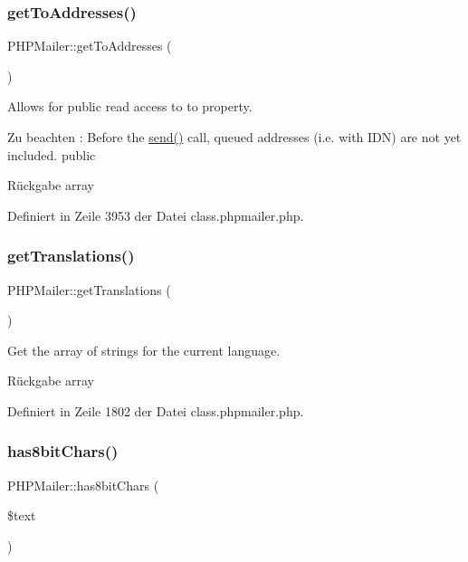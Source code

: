 \subsubsection{\texorpdfstring{get\+To\+Addresses()}{getToAddresses()}}
{\footnotesize\ttfamily P\+H\+P\+Mailer\+::get\+To\+Addresses (\begin{DoxyParamCaption}{ }\end{DoxyParamCaption})}

Allows for public read access to \textquotesingle{}to\textquotesingle{} property. \begin{DoxyNote}{Zu beachten}
\+: Before the \mbox{\hyperlink{class_p_h_p_mailer_afdd4742f07cfb0bfa7be86ce20468fa3}{send()}} call, queued addresses (i.\+e. with I\+DN) are not yet included.  public 
\end{DoxyNote}
\begin{DoxyReturn}{Rückgabe}
array 
\end{DoxyReturn}


Definiert in Zeile 3953 der Datei class.\+phpmailer.\+php.

\mbox{\label{class_p_h_p_mailer_a72c6fabba47dad807772801d1a6efdfb}} 
\subsubsection{\texorpdfstring{get\+Translations()}{getTranslations()}}
{\footnotesize\ttfamily P\+H\+P\+Mailer\+::get\+Translations (\begin{DoxyParamCaption}{ }\end{DoxyParamCaption})}

Get the array of strings for the current language. \begin{DoxyReturn}{Rückgabe}
array 
\end{DoxyReturn}


Definiert in Zeile 1802 der Datei class.\+phpmailer.\+php.

\mbox{\label{class_p_h_p_mailer_a3dcc28fcd9a275ba846f1dae847a483c}} 
\subsubsection{\texorpdfstring{has8bit\+Chars()}{has8bitChars()}}
{\footnotesize\ttfamily P\+H\+P\+Mailer\+::has8bit\+Chars (\begin{DoxyParamCaption}\item[{}]{\$text }\end{DoxyParamCaption})}

